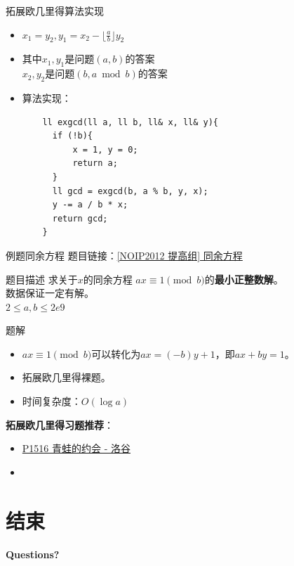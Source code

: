 \documentclass[9pt, c]{beamer}	%
\theoremstyle{plain}
\theoremstyle{definition}
\theoremstyle{remark}
\numberwithin{equation}{section}
\begin{document}
\begin{frame}[fragile]{拓展欧几里得算法}{实现}
  \begin{itemize}
    \item $x_1=y_2,y_1=x_2-\lfloor\frac{a}{b}\rfloor y_2$
    \item 其中$x_1,y_1$是问题$(a,b)$的答案\\
    $x_2,y_2$是问题$(b,a\bmod b)$的答案
    \pause 
    \item 算法实现：
    \begin{lstlisting}
    ll exgcd(ll a, ll b, ll& x, ll& y){
      if (!b){
          x = 1, y = 0;
          return a;
      }
      ll gcd = exgcd(b, a % b, y, x);
      y -= a / b * x;    
      return gcd;
    }
    \end{lstlisting}
  \end{itemize}
\end{frame}

\begin{frame}[fragile]{例题}{同余方程}
  题目链接：\href{https://www.luogu.com.cn/problem/P1082}{[NOIP2012 提高组] 同余方程}
  \begin{block}{题目描述}
    求关于$x$的同余方程 $ax \equiv 1 \pmod {b}$的\textbf{最小正整数解}。\\
    数据保证一定有解。\\
    $2 \leq a,b\leq 2e9$
  \end{block}
  \vspace{0.3cm}
  \pause

  \begin{exampleblock}{题解}
    \begin{itemize}
      \item $ax \equiv 1 \pmod {b}$可以转化为$ax=(-b)y+1$，即$ax+by=1$。
      \pause
      \item 拓展欧几里得裸题。
      \pause
      \item 时间复杂度：$O(\log{a})$
    \end{itemize}
  \end{exampleblock}
  \pause

  \textbf{拓展欧几里得习题推荐}：
  \begin{itemize}
    \item \href{https://www.luogu.com.cn/problem/P1516}{P1516 青蛙的约会 - 洛谷}
    \item 
  \end{itemize}
\end{frame}

\section{结束}
\begin{frame}
\begin{center} {\bfseries \Huge Questions?} \end{center}
\end{frame}
\end{document}
